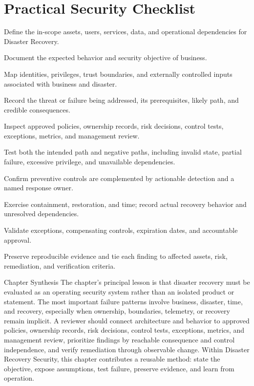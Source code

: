 \documentclass[11pt,letterpaper]{article}
\begin{document}
\section*{Practical Security Checklist}
\begin{CornellChecklist}
\item Define the in-scope assets, users, services, data, and operational dependencies for Disaster Recovery.
\item Document the expected behavior and security objective of business.
\item Map identities, privileges, trust boundaries, and externally controlled inputs associated with business and disaster.
\item Record the threat or failure being addressed, its prerequisites, likely path, and credible consequences.
\item Inspect approved policies, ownership records, risk decisions, control tests, exceptions, metrics, and management review.
\item Test both the intended path and negative paths, including invalid state, partial failure, excessive privilege, and unavailable dependencies.
\item Confirm preventive controls are complemented by actionable detection and a named response owner.
\item Exercise containment, restoration, and time; record actual recovery behavior and unresolved dependencies.
\item Validate exceptions, compensating controls, expiration dates, and accountable approval.
\item Preserve reproducible evidence and tie each finding to affected assets, risk, remediation, and verification criteria.
\end{CornellChecklist}
\begin{CornellSummaryBox}{Chapter Synthesis}
The chapter's principal lesson is that disaster recovery must be evaluated as an operating security system rather than an isolated product or statement. The most important failure patterns involve business, disaster, time, and recovery, especially when ownership, boundaries, telemetry, or recovery remain implicit. A reviewer should connect architecture and behavior to approved policies, ownership records, risk decisions, control tests, exceptions, metrics, and management review, prioritize findings by reachable consequence and control independence, and verify remediation through observable change. Within Disaster Recovery Security, this chapter contributes a reusable method: state the objective, expose assumptions, test failure, preserve evidence, and learn from operation.
\end{CornellSummaryBox}
\end{document}
